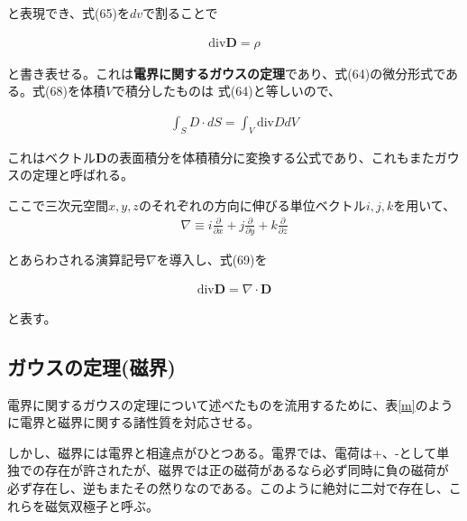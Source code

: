 \documentclass[7pt,uplatex,dvipdfmx,twocolumn]{jsarticle}
\begin{document}
と表現でき、式(65)を$dv$で割ることで

\begin{align}
\mathrm{div}\bm{D}=\rho
\end{align}

と書き表せる。これは\textbf{電界に関するガウスの定理}であり、式(64)の微分形式である。式(68)を体積$V$で積分したものは
式(64)と等しいので、

\begin{align}
\int _SD\cdot dS=\int _V\mathrm{div}DdV
\end{align}

これはベクトル$\bm{D}$の表面積分を体積積分に変換する公式であり、これもまたガウスの定理と呼ばれる。

ここで三次元空間$x,y,z$のそれぞれの方向に伸びる単位ベクトル$i,j,k$を用いて、
\begin{align}
\nabla\equiv i\frac{\partial}{\partial x}+j\frac{\partial}{\partial y}+k\frac{\partial}{\partial z}
\end{align}

とあらわされる演算記号$\nabla$を導入し、式(69)を

\begin{align}
\mathrm{div}\bm{D}=\nabla\cdot \bm{D}
\end{align}

と表す。

\subsection{ガウスの定理(磁界)}

電界に関するガウスの定理について述べたものを流用するために、表\ref{m}のように電界と磁界に関する諸性質を対応させる。

\begin{table}[H]
\centering
\caption{電気量と磁気量}
\label{m}
\end{table}

しかし、磁界には電界と相違点がひとつある。電界では、電荷は+、-として単独での存在が許されたが、磁界では正の磁荷があるなら必ず同時に負の磁荷が
必ず存在し、逆もまたその然りなのである。このように絶対に二対で存在し、これらを磁気双極子と呼ぶ。
\end{document}
